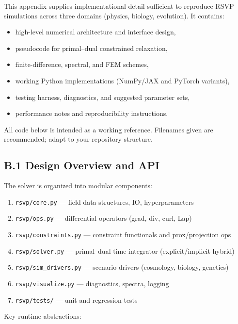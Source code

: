\documentclass[11pt,a4paper]{article}
\begin{document}
This appendix supplies implementational detail sufficient to reproduce RSVP simulations across three domains (physics, biology, evolution). It contains:

\begin{itemize}
  \item high-level numerical architecture and interface design,
  \item pseudocode for primal–dual constrained relaxation,
  \item finite-difference, spectral, and FEM schemes,
  \item working Python implementations (NumPy/JAX and PyTorch variants),
  \item testing harness, diagnostics, and suggested parameter sets,
  \item performance notes and reproducibility instructions.
\end{itemize}

All code below is intended as a working reference. Filenames given are recommended; adapt to your repository structure.

\subsection{B.1 Design Overview and API}

The solver is organized into modular components:

\begin{enumerate}
  \item \texttt{rsvp/core.py} — field data structures, IO, hyperparameters
  \item \texttt{rsvp/ops.py} — differential operators (grad, div, curl, Lap)
  \item \texttt{rsvp/constraints.py} — constraint functionals and prox/projection ops
  \item \texttt{rsvp/solver.py} — primal–dual time integrator (explicit/implicit hybrid)
  \item \texttt{rsvp/sim\_drivers.py} — scenario drivers (cosmology, biology, genetics)
  \item \texttt{rsvp/visualize.py} — diagnostics, spectra, logging
  \item \texttt{rsvp/tests/} — unit and regression tests
\end{enumerate}

Key runtime abstractions:
\end{document}
